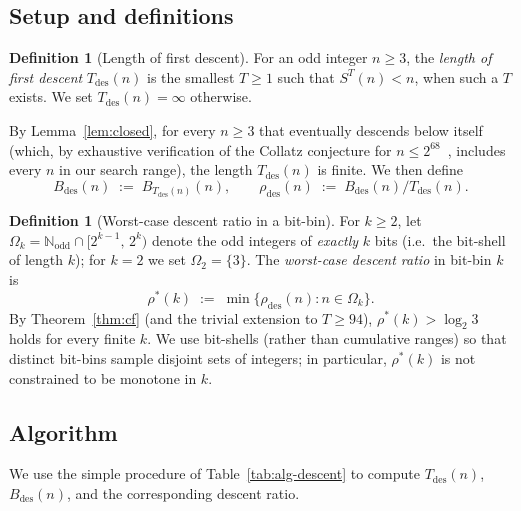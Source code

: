 \documentclass[11pt,a4paper]{article}
\theoremstyle{definition}
\newtheorem{definition}[theorem]{Definition}
\theoremstyle{remark}
\newcommand{\N}{\mathbb{N}}
\newcommand{\Nodd}{\N_{\mathrm{odd}}}
\begin{document}
\subsection{Setup and definitions}

\begin{definition}[Length of first descent]\label{def:Tdes}
For an odd integer $n \geq 3$, the \emph{length of first descent}
$T_{\mathrm{des}}(n)$ is the smallest $T \geq 1$ such that
$S^T(n) < n$, when such a $T$ exists.  We set
$T_{\mathrm{des}}(n) = \infty$ otherwise.
\end{definition}

By Lemma~\ref{lem:closed}, for every $n \geq 3$ that eventually
descends below itself (which, by exhaustive verification of the
Collatz conjecture for $n \leq 2^{68}$~\cite{BarinaCheckup}, includes
every $n$ in our search range), the length $T_{\mathrm{des}}(n)$ is
finite.  We then define
\[
  B_{\mathrm{des}}(n) \;:=\; B_{T_{\mathrm{des}}(n)}(n),
  \qquad
  \rho_{\mathrm{des}}(n) \;:=\;
    B_{\mathrm{des}}(n) / T_{\mathrm{des}}(n).
\]

\begin{definition}[Worst-case descent ratio in a bit-bin]
\label{def:worstk}
For $k \geq 2$, let
$\Omega_k = \Nodd \cap [2^{k-1},\, 2^k)$ denote the odd integers
of \emph{exactly} $k$ bits (i.e.\ the bit-shell of length $k$); for
$k = 2$ we set $\Omega_2 = \{3\}$.  The \emph{worst-case descent
ratio} in bit-bin $k$ is
\[
  \rho^{*}(k) \;:=\;
  \min\bigl\{\rho_{\mathrm{des}}(n) : n \in \Omega_k\bigr\}.
\]
By Theorem~\ref{thm:cf} (and the trivial extension to $T \geq 94$),
$\rho^{*}(k) > \log_2 3$ holds for every finite $k$.  We use
bit-shells (rather than cumulative ranges) so that distinct bit-bins
sample disjoint sets of integers; in particular, $\rho^{*}(k)$ is not
constrained to be monotone in $k$.
\end{definition}

\subsection{Algorithm}

We use the simple procedure of Table~\ref{tab:alg-descent} to compute
$T_{\mathrm{des}}(n)$, $B_{\mathrm{des}}(n)$, and the corresponding
descent ratio.
\end{document}
